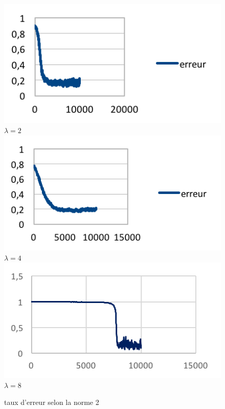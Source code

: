 \begin{figure}[h]
\begin{center}
\includegraphics[width=1\textwidth]{images/17_10_20-XOR/courbe-1.png}
\centering\\$\lambda = 2$
\endminipage\hfill
{}
\includegraphics[width=1\textwidth]{images/17_10_20-XOR/courbe-2.png}
\centering\\$\lambda = 4$
\endminipage\hfill
{}
\includegraphics[width=1\textwidth]{images/17_10_20-XOR/courbe-3.png}
\centering\\$\lambda = 8$
\endminipage\hfill
\caption{taux d'erreur selon la norme 2}
\label{fig:comp_lambda_XOR}


\end{center}
\end{figure}

